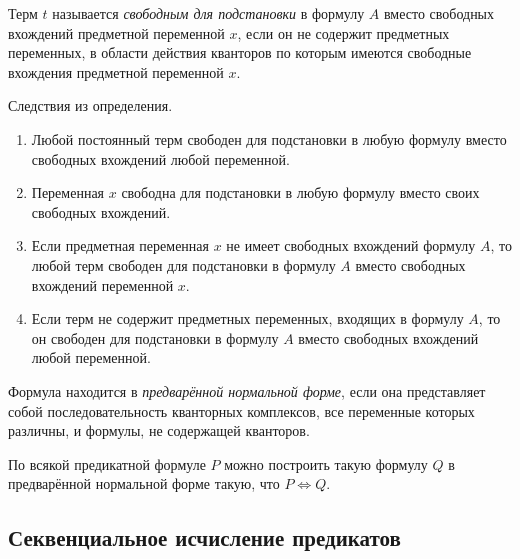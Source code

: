 \begin{definition}
	Терм $ t $ называется \emph{свободным для подстановки} в формулу $ A $ вместо свободных вхождений предметной переменной $ x $, если он не содержит предметных переменных, в области действия кванторов по которым имеются свободные вхождения предметной переменной $ x $.
\end{definition}

\begin{undefthm}{Следствия из определения.}
	\hfill
	\begin{enumerate}
		\item Любой постоянный терм свободен для подстановки в любую формулу вместо свободных вхождений любой переменной.
		\item Переменная $ x $ свободна для подстановки в любую формулу вместо своих свободных вхождений.
		\item Если предметная переменная $ x $ не имеет свободных вхождений формулу $ A $, то любой терм свободен для подстановки в формулу $ A $ вместо свободных вхождений переменной $ x $.
		\item Если терм не содержит предметных переменных, входящих в формулу $ A $, то он свободен для подстановки в формулу $ A $ вместо свободных вхождений любой переменной.
	\end{enumerate}
\end{undefthm}

\begin{definition}
	Формула находится в \emph{предварённой нормальной форме}, если она представляет собой последовательность кванторных комплексов, все переменные которых различны, и формулы, не содержащей кванторов.
\end{definition}

\begin{theorem}
	По всякой предикатной формуле $ P $ можно построить такую формулу $ Q $ в предварённой нормальной форме такую, что $ P \iff Q $.
\end{theorem}

\subsection*{Секвенциальное исчисление предикатов}

